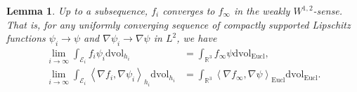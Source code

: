 \documentclass[letter]{amsart}
\newtheorem{lem}[thm]{Lemma}
\theoremstyle{definition}
\theoremstyle{remark}
\begin{document}
\begin{lem}\label{weak-W12}
	Up to a subsequence, $f_i$ converges to $f_\infty$ in the weakly $W^{1,2}$-sense. That is, for any uniformly converging sequence of compactly supported Lipschitz functions $\psi _i \to \psi $ and $\nabla \psi _i \to \nabla \psi $ in $L^2$, we have 
	\begin{align*}
		\lim_{i\to \infty} \int_{\mathcal{E}_i} f _i \psi _i \mathrm{dvol}_{h_i} & = \int_{\mathbb{R}^3} f _\infty \psi \mathrm{dvol}_{\mathrm{Eucl}},\\
		\lim_{i\to \infty} \int_{\mathcal{E}_i} \left<\nabla f _i, \nabla \psi _i \right>_{h_i} \mathrm{dvol}_{h_i} &= \int_{\mathbb{R}^3} \left<\nabla f _\infty, \nabla \psi  \right>_{\mathrm{Eucl} } \mathrm{dvol}_{\mathrm{Eucl}}.
	\end{align*}
\end{lem}
\end{document}
